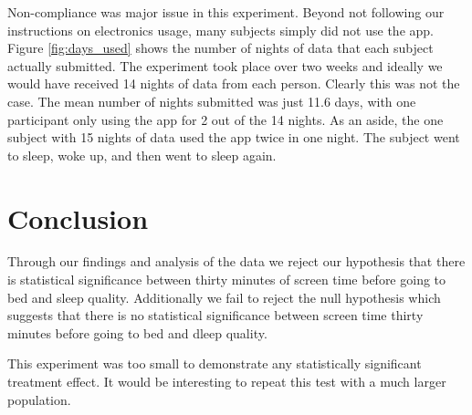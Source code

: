 \documentclass[12pt,]{article}
\begin{document}
Non-compliance was major issue in this experiment. Beyond not following
our instructions on electronics usage, many subjects simply did not use
the app. Figure \ref{fig:days_used} shows the number of nights of data
that each subject actually submitted. The experiment took place over two
weeks and ideally we would have received 14 nights of data from each
person. Clearly this was not the case. The mean number of nights
submitted was just 11.6 days, with one participant only using the app
for 2 out of the 14 nights. As an aside, the one subject with 15 nights
of data used the app twice in one night. The subject went to sleep, woke
up, and then went to sleep again.

\section{Conclusion}\label{conclusion}

Through our findings and analysis of the data we reject our hypothesis
that there is statistical significance between thirty minutes of screen
time before going to bed and sleep quality. Additionally we fail to
reject the null hypothesis which suggests that there is no statistical
significance between screen time thirty minutes before going to bed and
dleep quality.

This experiment was too small to demonstrate any statistically
significant treatment effect. It would be interesting to repeat this
test with a much larger population.
\end{document}
